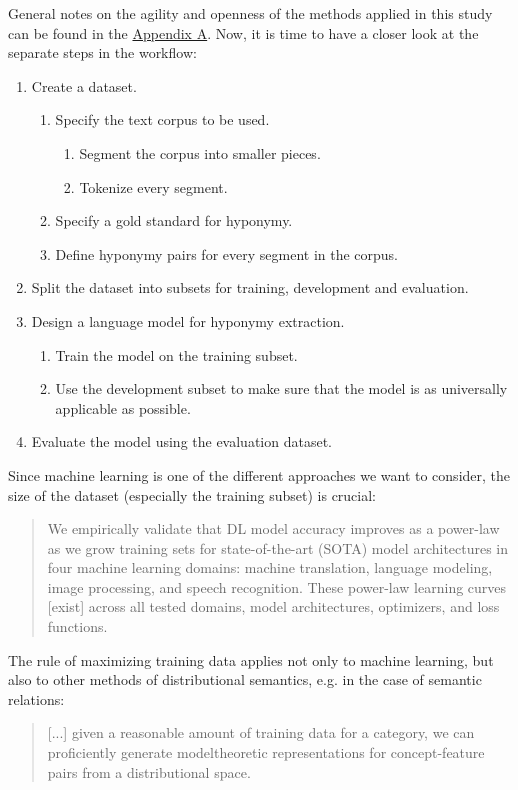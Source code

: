 \documentclass[jou]{apa6} %
\begin{document}
General notes on the agility and openness of the methods applied in this study can be found in the \hyperref[sec:appendixA]{Appendix A}. Now, it is time to have a closer look at the separate steps in the workflow:
\begin{enumerate}
         \item Create a dataset.
         \begin{enumerate}
		\item Specify the text corpus to be used.
		 \begin{enumerate}
			\item Segment the corpus into smaller pieces.
			\item Tokenize every segment.
		\end{enumerate}
		\item Specify a gold standard for hyponymy.
		\item Define hyponymy pairs for every segment in the corpus.
	\end{enumerate}
         \item Split the dataset into subsets for training, development and evaluation.
         \item Design a language model for hyponymy extraction.
         \begin{enumerate}
		\item Train the model on the training subset.
		\item Use the development subset to make sure that the model is as universally applicable as possible.
	\end{enumerate}
         \item Evaluate the model using the evaluation dataset.
\end{enumerate}
Since machine learning is one of the different approaches we want to consider, the size of the dataset (especially the training subset) is crucial:
\blockquote[{\cite[p.~13]{hestnessDeepLearningScaling2017}}]{We empirically validate that DL model accuracy improves as a power-law as we grow training sets for state-of-the-art (SOTA) model architectures in four machine learning domains: machine translation, language modeling, image processing, and speech recognition. These power-law learning curves [exist] across all tested domains, model architectures, optimizers, and loss functions.}
The rule of maximizing training data applies not only to machine learning, but also to other methods of distributional semantics, e.g. in the case of semantic relations:
\blockquote[{\cite[p.~27]{herbelotBuildingSharedWorld2015}}]{[...] given a reasonable amount of training data for a category, we can proficiently generate modeltheoretic representations for concept-feature pairs from a distributional space.}
\end{document}
